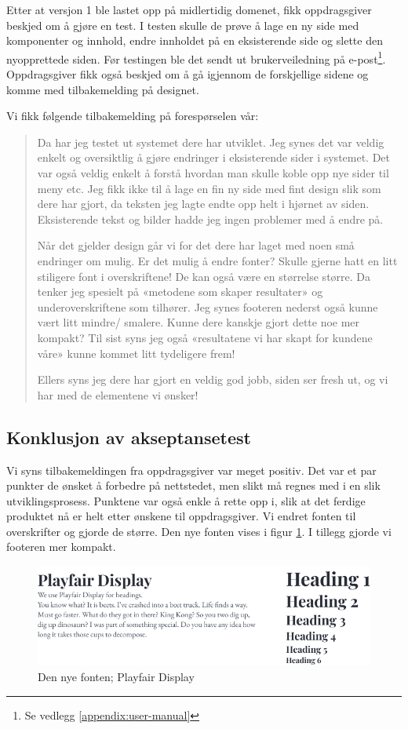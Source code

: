 Etter at versjon 1 ble lastet opp på midlertidig domenet, fikk oppdragsgiver beskjed om å gjøre en test. I testen skulle de prøve å lage en ny side med komponenter og innhold, endre innholdet på en eksisterende side og slette den nyopprettede siden. Før testingen ble det sendt ut brukerveiledning på e-post\footnote{Se vedlegg \ref{appendix:user-manual}}. Oppdragsgiver fikk også beskjed om å gå igjennom de forskjellige sidene og komme med tilbakemelding på designet. 

Vi fikk følgende tilbakemelding på forespørselen vår: 

\begin{quote}
Da har jeg testet ut systemet dere har utviklet. Jeg synes det var veldig enkelt og oversiktlig å gjøre endringer i eksisterende sider i systemet. Det var også veldig enkelt å forstå hvordan man skulle koble opp nye sider til meny etc. Jeg fikk ikke til å lage en fin ny side med fint design slik som dere har gjort, da teksten jeg lagte endte opp helt i hjørnet av siden. Eksisterende tekst og bilder hadde jeg ingen problemer med å endre på.

Når det gjelder design går vi for det dere har laget med noen små endringer om mulig. Er det mulig å endre fonter? Skulle gjerne hatt en litt stiligere font i overskriftene! De kan også være en størrelse større. Da tenker jeg spesielt på «metodene som skaper resultater» og underoverskriftene som tilhører. Jeg synes footeren nederst også kunne vært litt mindre/ smalere. Kunne dere kanskje gjort dette noe mer kompakt? Til sist syns jeg også «resultatene vi har skapt for kundene våre» kunne kommet litt tydeligere frem!

Ellers syns jeg dere har gjort en veldig god jobb, siden ser fresh ut, og vi har med de elementene vi ønsker!
\end{quote}

\subsection{Konklusjon av akseptansetest}
Vi syns tilbakemeldingen fra oppdragsgiver var meget positiv. Det var et par punkter de ønsket å forbedre på nettstedet, men slikt må regnes med i en slik utviklingsprosess. Punktene var også enkle å rette opp i, slik at det ferdige produktet nå er helt etter ønskene til oppdragsgiver. Vi endret fonten til overskrifter og gjorde de større. Den nye fonten vises i figur \ref{fig:typography-new}. I tillegg gjorde vi footeren mer kompakt.
\begin{figure}[H]
    \centering
    \includegraphics[width=\textwidth]{design/typography-headings.png}
    \caption{Den nye fonten; Playfair Display}
    \label{fig:typography-new}
\end{figure}


